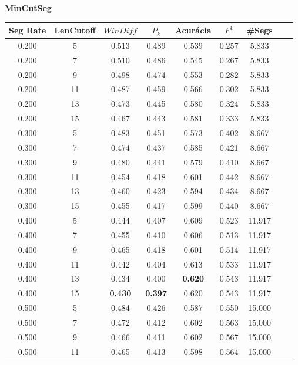  \center
	\textbf{MinCutSeg}  
\begin{longtable}[c]{|c|c|c|c|c|c|c|c|c|} 
\hline 
 Seg Rate & LenCutoff & $WinDiff$ & $P_k$ & Acurácia & $F^1$ & \#Segs\\ \hline 
 0.200 & 5 & 0.513 & 0.489 & 0.539 & 0.257 & 5.833  \\ \hline 
 0.200 & 7 & 0.510 & 0.486 & 0.545 & 0.267 & 5.833  \\ \hline 
 0.200 & 9 & 0.498 & 0.474 & 0.553 & 0.282 & 5.833  \\ \hline 
 0.200 & 11 & 0.487 & 0.459 & 0.566 & 0.302 & 5.833  \\ \hline 
 0.200 & 13 & 0.473 & 0.445 & 0.580 & 0.324 & 5.833  \\ \hline 
 0.200 & 15 & 0.467 & 0.443 & 0.581 & 0.333 & 5.833  \\ \hline 
 0.300 & 5 & 0.483 & 0.451 & 0.573 & 0.402 & 8.667  \\ \hline 
 0.300 & 7 & 0.474 & 0.437 & 0.585 & 0.421 & 8.667  \\ \hline 
 0.300 & 9 & 0.480 & 0.441 & 0.579 & 0.410 & 8.667  \\ \hline 
 0.300 & 11 & 0.454 & 0.418 & 0.601 & 0.442 & 8.667  \\ \hline 
 0.300 & 13 & 0.460 & 0.423 & 0.594 & 0.434 & 8.667  \\ \hline 
 0.300 & 15 & 0.455 & 0.417 & 0.599 & 0.440 & 8.667  \\ \hline 
 0.400 & 5 & 0.444 & 0.407 & 0.609 & 0.523 & 11.917  \\ \hline 
 0.400 & 7 & 0.455 & 0.410 & 0.606 & 0.513 & 11.917  \\ \hline 
 0.400 & 9 & 0.465 & 0.418 & 0.601 & 0.514 & 11.917  \\ \hline 
 0.400 & 11 & 0.442 & 0.404 & 0.613 & 0.533 & 11.917  \\ \hline 
 0.400 & 13 & 0.434 & 0.400 & \cellcolor{gray!20} \textbf{0.620} & 0.543 & 11.917  \\ \hline 
 0.400 & 15 & \cellcolor{gray!20} \textbf{0.430} & \cellcolor{gray!20} \textbf{0.397} & 0.620 & 0.543 & 11.917  \\ \hline 
 0.500 & 5 & 0.484 & 0.426 & 0.587 & 0.550 & 15.000  \\ \hline 
 0.500 & 7 & 0.472 & 0.412 & 0.602 & 0.563 & 15.000  \\ \hline 
 0.500 & 9 & 0.466 & 0.411 & 0.602 & 0.567 & 15.000  \\ \hline 
 0.500 & 11 & 0.465 & 0.413 & 0.598 & 0.564 & 15.000  \\ \hline 

\end{longtable}
